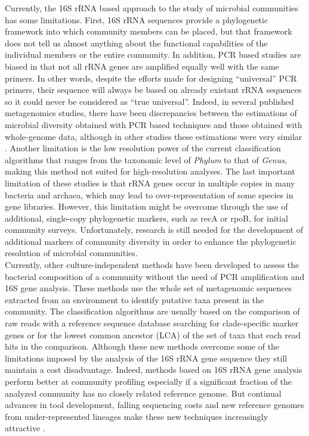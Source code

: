 Currently, the 16S rRNA based approach to the study of microbial communities has some limitations. First, 16S rRNA sequences provide a phylogenetic framework into which community members can be placed, but that framework does not tell us almost anything about the functional capabilities of the individual members or the entire community. In addition, PCR based studies are biased in that not all rRNA genes are amplified equally well with the same primers. In other words, despite the efforts made for designing ``universal'' PCR primers, their sequence will always be based on already existant rRNA sequences so it could never be considered as ``true universal''. Indeed, in several published metagenomics studies, there have been discrepancies between the estimations of microbial diversity obtained with PCR based techniques and those obtained with whole-genome data, although in other studies these estimations were very similar \cite{liles2003census, tyson2004community}. Another limitation is the low resolution power of the current classification algorithms that ranges from the taxonomic level of \textit{Phylum} to that of \textit{Genus}, making this method not suited for high-resolution analyses. The last important limitation of these studies is that rRNA genes occur in multiple copies in many bacteria and archaea, which may lead to over-representation of some species in gene libraries. However, this limitation might be overcome through the use of additional, single-copy phylogenetic markers, such as recA or rpoB, for initial community surveys. Unfortunately, research is still needed for the development of additional markers of community diversity in order to enhance the phylogenetic resolution of microbial communities.\\
Currently, other culture-independent methods have been developed to assess the bacterial composition of a community without the need of PCR amplification and 16S gene analysis. These methods use the whole set of metagenomic sequences extracted from an environment to identify putative taxa present in the community. The classification algorithms are usually based on the comparison of raw reads with a reference sequence database searching for clade-specific marker genes \cite{segata2012metagenomic} or for the lowest common ancestor (LCA) \cite{huson2007megan} of the set of taxa that each read hits in the comparison. Although these new methods overcome some of the limitations imposed by the analysis of the 16S rRNA gene sequence they still maintain a cost disadvantage. Indeed, methods based on 16S rRNA gene analysis perform better at community profiling especially if a significant fraction of the analyzed community has no closely related reference genome. But continual advances in tool development, falling sequencing costs and new reference genomes from under-represented lineages make these new techniques increasingly attractive \cite{haft2012high}.\\

